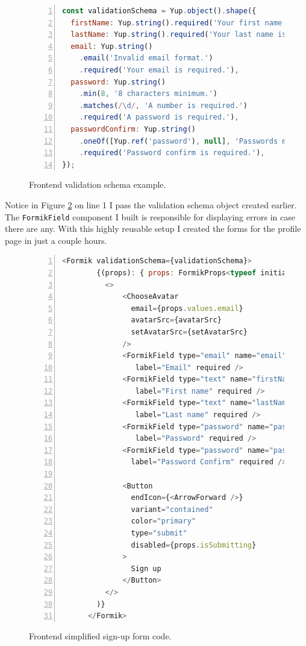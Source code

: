 \begin{figure}[H]
\begin{lstlisting}[numbers=left,language=JavaScript]
const validationSchema = Yup.object().shape({
  firstName: Yup.string().required('Your first name is required.'),
  lastName: Yup.string().required('Your last name is required.'),
  email: Yup.string()
    .email('Invalid email format.')
    .required('Your email is required.'),
  password: Yup.string()
    .min(8, '8 characters minimum.')
    .matches(/\d/, 'A number is required.')
    .required('A password is required.'),
  passwordConfirm: Yup.string()
    .oneOf([Yup.ref('password'), null], 'Passwords must match.')
    .required('Password confirm is required.'),
});
\end{lstlisting}
\caption{Frontend validation schema example.}
\label{figure:frontend-validation-schema}
\end{figure}

Notice in Figure \ref{figure:frontend-sign-up-form} on line 1 I pass the validation schema object created earlier. The \verb|FormikField| component I built is responsible for displaying errors in case there are any. With this highly reusable setup I created the forms for the profile page in just a couple hours.

\begin{figure}[H]
\begin{lstlisting}[numbers=left,language=JavaScript]
  <Formik validationSchema={validationSchema}>
        {(props): { props: FormikProps<typeof initialValues> } => (
          <>
              <ChooseAvatar
                email={props.values.email}
                avatarSrc={avatarSrc}
                setAvatarSrc={setAvatarSrc}
              />
              <FormikField type="email" name="email"
              	 label="Email" required />
              <FormikField type="text" name="firstName"
              	 label="First name" required />
              <FormikField type="text" name="lastName"
              	 label="Last name" required />
              <FormikField type="password" name="password"
              	 label="Password" required />
              <FormikField type="password" name="passwordConfirm"
                label="Password Confirm" required />

              <Button
                endIcon={<ArrowForward />}
                variant="contained"
                color="primary"
                type="submit"
                disabled={props.isSubmitting}
              >
                Sign up
              </Button>
          </>
        )}
      </Formik>
\end{lstlisting}
\caption{Frontend simplified sign-up form code.}
\label{figure:frontend-sign-up-form}
\end{figure}

